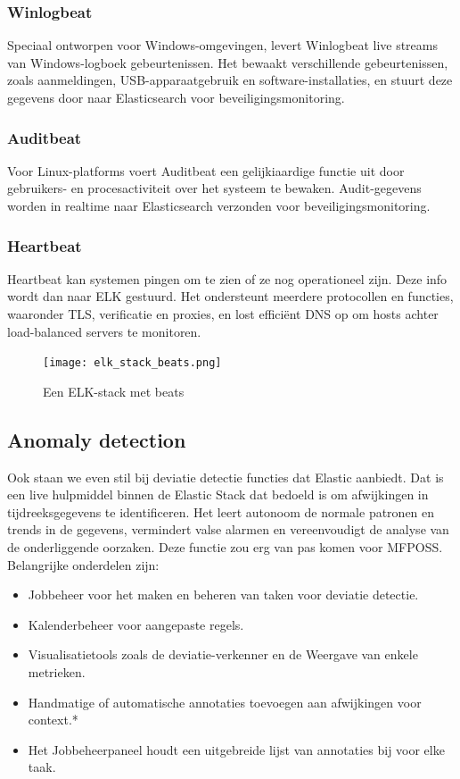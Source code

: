 \subsubsection{Winlogbeat}
Speciaal ontworpen voor Windows-omgevingen, levert Winlogbeat live streams van Windows-logboek gebeurtenissen. Het bewaakt verschillende gebeurtenissen, zoals aanmeldingen, USB-apparaatgebruik en software-installaties, en stuurt deze gegevens door naar Elasticsearch voor beveiligingsmonitoring.

\subsubsection{Auditbeat}
Voor Linux-platforms voert Auditbeat een gelijkiaardige functie uit door gebruikers- en procesactiviteit over het systeem te bewaken. Audit-gegevens worden in realtime naar Elasticsearch verzonden voor beveiligingsmonitoring.

\subsubsection{Heartbeat}
Heartbeat kan systemen pingen om te zien of ze nog operationeel zijn. Deze info wordt dan naar ELK gestuurd. Het ondersteunt meerdere protocollen en functies, waaronder TLS, verificatie en proxies, en lost efficiënt DNS op om hosts achter load-balanced servers te monitoren.


\begin{figure}[h]
    \centering
    \texttt{[image: elk\_stack\_beats.png]}
    \caption{Een ELK-stack met beats ~\autocite{DavidTaylor}}
    \label{fig:Een ELK-stack met beats}
\end{figure}


\subsection{Anomaly detection}
Ook staan we even stil bij deviatie detectie functies dat Elastic aanbiedt. Dat is een live hulpmiddel binnen de Elastic Stack dat bedoeld is om afwijkingen in tijdreeksgegevens te identificeren. Het leert autonoom de normale patronen en trends in de gegevens, vermindert valse alarmen en vereenvoudigt de analyse van de onderliggende oorzaken. Deze functie zou erg van pas komen voor MFPOSS. Belangrijke onderdelen zijn:
\begin{itemize}
    \item Jobbeheer voor het maken en beheren van taken voor deviatie detectie.
    \item Kalenderbeheer voor aangepaste regels.
    \item Visualisatietools zoals de deviatie-verkenner en de Weergave van enkele metrieken.
    \item Handmatige of automatische annotaties toevoegen aan afwijkingen voor context.*
    \item Het Jobbeheerpaneel houdt een uitgebreide lijst van annotaties bij voor elke taak.
\end{itemize}


